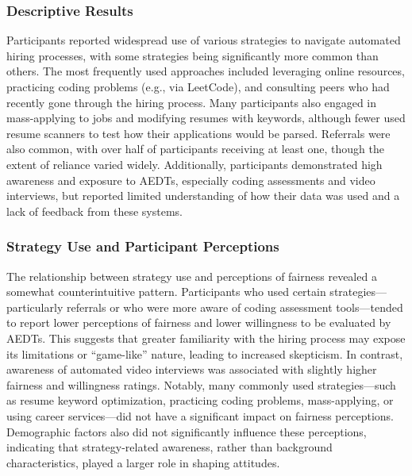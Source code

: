 \subsubsection{Descriptive Results}
Participants reported widespread use of various strategies to navigate automated hiring processes, with some strategies being significantly more common than others. The most frequently used approaches included leveraging online resources, practicing coding problems (e.g., via LeetCode), and consulting peers who had recently gone through the hiring process. Many participants also engaged in mass-applying to jobs and modifying resumes with keywords, although fewer used resume scanners to test how their applications would be parsed. Referrals were also common, with over half of participants receiving at least one, though the extent of reliance varied widely. Additionally, participants demonstrated high awareness and exposure to AEDTs, especially coding assessments and video interviews, but reported limited understanding of how their data was used and a lack of feedback from these systems.

\subsubsection{Strategy Use and Participant Perceptions}
The relationship between strategy use and perceptions of fairness revealed a somewhat counterintuitive pattern. Participants who used certain strategies—particularly referrals or who were more aware of coding assessment tools—tended to report lower perceptions of fairness and lower willingness to be evaluated by AEDTs. This suggests that greater familiarity with the hiring process may expose its limitations or “game-like” nature, leading to increased skepticism. In contrast, awareness of automated video interviews was associated with slightly higher fairness and willingness ratings. Notably, many commonly used strategies—such as resume keyword optimization, practicing coding problems, mass-applying, or using career services—did not have a significant impact on fairness perceptions. Demographic factors also did not significantly influence these perceptions, indicating that strategy-related awareness, rather than background characteristics, played a larger role in shaping attitudes.

